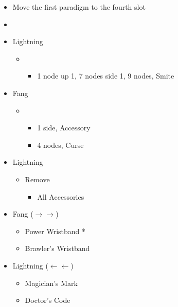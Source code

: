 \begin{menu}
		\begin{itemize}
			\paradigm
			\begin{itemize}
				\item Move the first paradigm to the fourth slot
				\item {}%
				      {\paradigmline{(\rav)}{\syn}{\sab}}%
				      {\paradigmline{(\rav)}{\rav}{(\sab)}}%
				      {\paradigmline{[\rav]}{(\rav)}{(\com)}}%
				      {\paradigmline[4]{\textit{\rav}}{\textit{\rav}}{\textit{\com}}}%
				      {\paradigmline{[\com]}{\rav}{\com}}%
				      {\paradigmline{[\com]}{\rav}{\com}}
			\end{itemize}
			\crystarium
			\begin{itemize}
				\item Lightning
				      \begin{itemize}
					      \item \com
					            \begin{itemize}
						            \item 1 node up 1, 7 nodes side 1, 9 nodes, Smite
					            \end{itemize}
				      \end{itemize}
				\item Fang
				      \begin{itemize}
					      \item \sab
					            \begin{itemize}
						            \item 1 side, Accessory
						            \item 4 nodes, Curse
					            \end{itemize}
				      \end{itemize}
			\end{itemize}
			\equip
			\begin{itemize}
				\item Lightning
				      \begin{itemize}
					      \item Remove
					            \begin{itemize}
						            \item All Accessories
					            \end{itemize}
				      \end{itemize}
				\item Fang ($\rightarrow\rightarrow$)
				      \begin{itemize}
					      \item Power Wristband *
					      \item Brawler's Wristband
				      \end{itemize}
				\item Lightning ($\leftarrow\leftarrow$)
				      \begin{itemize}
					      \item Magician's Mark
					      \item Doctor's Code
				      \end{itemize}
			\end{itemize}
		\end{itemize}
\end{menu}
